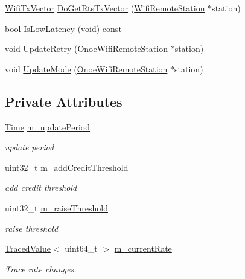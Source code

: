 \begin{DoxyCompactItemize}
\item 
\hyperlink{classns3_1_1WifiTxVector}{Wifi\+Tx\+Vector} \hyperlink{classns3_1_1OnoeWifiManager_a235403aacb2b69d019b23a86263623d7}{Do\+Get\+Rts\+Tx\+Vector} (\hyperlink{structns3_1_1WifiRemoteStation}{Wifi\+Remote\+Station} $\ast$station)
\item 
bool \hyperlink{classns3_1_1OnoeWifiManager_a58c0d869c4662a9c40a4bcdc63024eb0}{Is\+Low\+Latency} (void) const 
\item 
void \hyperlink{classns3_1_1OnoeWifiManager_a257355b8311b31c9c649b1da31db2a5d}{Update\+Retry} (\hyperlink{structns3_1_1OnoeWifiRemoteStation}{Onoe\+Wifi\+Remote\+Station} $\ast$station)
\item 
void \hyperlink{classns3_1_1OnoeWifiManager_afecc5c3113a6fa42f1d784fec75e3876}{Update\+Mode} (\hyperlink{structns3_1_1OnoeWifiRemoteStation}{Onoe\+Wifi\+Remote\+Station} $\ast$station)
\end{DoxyCompactItemize}
\subsection*{Private Attributes}
\begin{DoxyCompactItemize}
\item 
\hyperlink{classns3_1_1Time}{Time} \hyperlink{classns3_1_1OnoeWifiManager_a43506e7013f037ec858df5af2de2f1cb}{m\+\_\+update\+Period}
\begin{DoxyCompactList}\small\item\em update period \end{DoxyCompactList}\item 
uint32\+\_\+t \hyperlink{classns3_1_1OnoeWifiManager_ab90c1f44166227ffa41233b0c7c65a52}{m\+\_\+add\+Credit\+Threshold}
\begin{DoxyCompactList}\small\item\em add credit threshold \end{DoxyCompactList}\item 
uint32\+\_\+t \hyperlink{classns3_1_1OnoeWifiManager_abd4f1bac1a93e084879e39100096d8cf}{m\+\_\+raise\+Threshold}
\begin{DoxyCompactList}\small\item\em raise threshold \end{DoxyCompactList}\item 
\hyperlink{classns3_1_1TracedValue}{Traced\+Value}$<$ uint64\+\_\+t $>$ \hyperlink{classns3_1_1OnoeWifiManager_a5ba916c2f45dd5687c035db25dc86800}{m\+\_\+current\+Rate}
\begin{DoxyCompactList}\small\item\em Trace rate changes. \end{DoxyCompactList}\end{DoxyCompactItemize}
